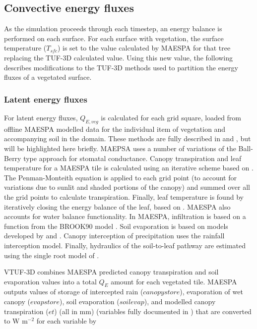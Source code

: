 \documentclass[final,3p,times,authoryear]{elsarticle}
\begin{document}
\subsection{Convective energy fluxes}

As the simulation proceeds through each timestep, an energy balance is performed on each surface. For each surface with vegetation, the surface temperature ($T_{sfc}$) is set to the value calculated by MAESPA for that tree replacing the TUF-3D calculated value. Using this new value, the following describes modifications to the TUF-3D methods used to partition the energy fluxes of a vegetated surface.

\subsubsection{Latent energy fluxes}
\label{sec:calcleaftemp}
\label{sec:waterbalance}

For latent energy fluxes, $Q_{E,veg}$ is calculated for each grid square, loaded from offline MAESPA modelled data for the individual item of vegetation and accompanying soil in the domain.
These methods are fully described in \cite{Duursma2012} and \cite{Medlyn2007}, but will be highlighted here briefly. MAEPSA uses a number of variations of the Ball-Berry type approach \citep{Ball1987,Duursma2012} for stomatal conductance. Canopy transpiration and leaf temperature for a MAESPA tile is calculated using an iterative scheme based on \cite{Wang1998}. The Penman-Monteith equation \citep{Penman1948,Monteith1965} is applied to each grid point (to account for variations due to sunlit and shaded portions of the canopy) and summed over all the grid points to calculate transpiration. Finally, leaf temperature is found by iteratively closing the energy balance of the leaf, based on \cite{Wang1998}. MAESPA also accounts for water balance functionality. In MAESPA, infiltration is based on a function from the BROOK90 model \citep{Federer2003}. Soil evaporation is based on models developed by \cite{Choudhury1988} and \cite{Williams2001}. Canopy interception of precipitation uses the \cite{Rutter1975} rainfall interception model. Finally, hydraulics of the soil-to-leaf pathway are estimated using the single root model of \cite{Gardner1960}.

VTUF-3D combines MAESPA predicted canopy transpiration and soil evaporation values into a total $Q_{E}$ amount for each vegetated tile. MAESPA outputs values of storage of intercepted rain ($canopystore$), evaporation of wet canopy ($evapstore$), soil evaporation ($soilevap$), and modelled canopy transpiration ($et$) (all in mm) (variables fully documented in \cite{Duursma2016}) that are converted to W m$^{-2}$ for each variable by 
\end{document}
